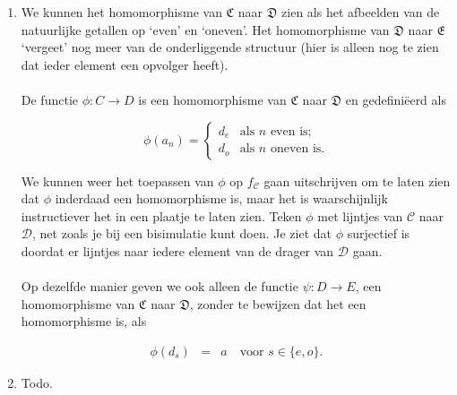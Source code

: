 \documentclass[a4paper,11pt]{article}
\begin{document}
\begin{enumerate}

\item %

We kunnen het homomorphisme van $\mathfrak{C}$ naar $\mathfrak{D}$  zien als
het afbeelden van de natuurlijke getallen op `even' en `oneven'. Het
homomorphisme van $\mathfrak{D}$ naar $\mathfrak{E}$ `vergeet' nog meer van de
onderliggende structuur (hier is alleen nog te zien dat ieder element een
opvolger heeft).

\paragraph{}

De functie $\phi : C \rightarrow D$ is een homomorphisme van $\mathfrak{C}$ naar
$\mathfrak{D}$ en gedefini\"eerd als

\begin{displaymath}
\phi(a_{n}) = \begin{cases}
  d_{e} & \text{als $n$ even is;} \\
  d_{o} & \text{als $n$ oneven is.}
\end{cases}
\end{displaymath}

We kunnen weer het toepassen van $\phi$ op $f_{\mathcal{C}}$ gaan uitschrijven
om te laten zien dat $\phi$ inderdaad een homomorphisme is, maar het is
waarschijnlijk instructiever het in een plaatje te laten zien. Teken $\phi$
met lijntjes van $\mathcal{C}$ naar $\mathcal{D}$, net zoals je bij een
bisimulatie kunt doen. Je ziet dat $\phi$ surjectief is doordat er lijntjes
naar iedere element van de drager van $\mathcal{D}$ gaan.

\paragraph{}

Op dezelfde manier geven we ook alleen de functie $\psi : D \rightarrow E$,
een homomorphisme van $\mathfrak{C}$ naar $\mathfrak{D}$, zonder te bewijzen
dat het een homomorphisme is, als

\begin{eqnarray*}
\phi(d_{s}) & = & a \quad \text{voor $s \in \{e,o\}$.}
\end{eqnarray*}

\item %

Todo.

\end{enumerate}
\end{document}
